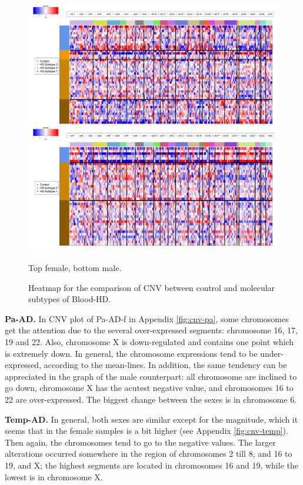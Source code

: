 \begin{figure}[!ht]
    \centerline{\includegraphics[width = 15cm]{Figures/CNV/cnv-blood.jpg}}
\caption{Heatmap for the comparison of CNV between control and molecular subtypes of Blood-HD.}
\footnotesize Top female, bottom male.
\label{fig:cnv-hm-blood}
\end{figure}

\textbf{Pa-AD.} In CNV plot of Pa-AD-f in Appendix \ref{fig:cnv-pa}, some chromosomes get the attention due to the several over-expressed segments: chromosome 16, 17, 19 and 22. Also, chromosome X is down-regulated and contains one point which is extremely down. In general, the chromosome expressions tend to be under-expressed, according to the mean-lines. In addition, the same tendency can be appreciated in the graph of the male counterpart: all chromosome are inclined to go down, chromosome X has the acutest negative value, and chromosomes 16 to 22 are over-expressed. The biggest change between the sexes is in chromosome 6.

\textbf{Temp-AD.} In general, both sexes are similar except for the magnitude, which it seems that in the female samples is a bit higher (see Appendix \ref{fig:cnv-temp}). Then again, the chromosomes tend to go to the negative values. The larger alterations occurred somewhere in the region of chromosomes 2 till 8, and 16 to 19, and X; the highest segments are located in chromosomes 16 and 19, while the lowest is in chromosome X.

